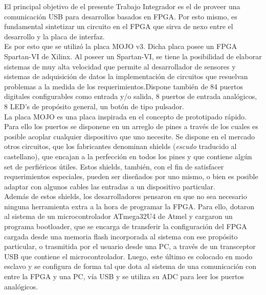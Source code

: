 El principal objetivo de el presente Trabajo Integrador es el de proveer una comunicación USB para desarrollos basados en FPGA. Por esto mismo, es fundamental sintetizar un circuito en el FPGA que sirva de nexo entre el desarrollo y la placa de interfaz.\\

Es por esto que se utilizó la placa MOJO v3. Dicha placa posee un FPGA Spartan-VI de Xilinx. Al poseer un Spartan-VI, se tiene la posibilidad de elaborar sistemas de muy alta velocidad que permite al desarrollador de sensores y sistemas de adquisición de datos la implementación de circuitos que resuelvan problemas a la medida de los requerimientos.Dispone también de 84 puertos digitales configurables como entrada y/o salida, 8 puertos de entrada analógicos, 8 LED's de propósito general, un botón de tipo pulsador.\\

La placa MOJO es una placa inspirada en el concepto de prototipado rápido. Para ello los puertos se disponene en un arreglo de pines a través de los cuales es posible acoplar cualquier dispositivo que uno necesite. Se dispone en el mercado otros circuitos, que los fabricantes denominan shields ({\it escudo} traducido al castellano), que encajan a la perfección en todos los pines y que contiene algún set de perfiéricos útiles. Estos shields, también, con el fin de satisfacer requerimientos especiales, pueden ser diseñados por uno mismo, o bien es posible adaptar con algunos cables las entradas a un dispositivo particular.\\

Además de estos shields, los desarrolladores pensaron en que no sea necesario ninguna herramienta extra a la hora de programar la FPGA. Para ello, dotaron al sistema de un microcontrolador ATmega32U4 de Atmel y cargaron un programa bootloader, que se encarga de transferir la configuración del FPGA cargada desde una memoria flash incorporada al sistema con ese propósito particular, o trasmitida por el usuario desde una PC, a través de un transceptor USB que contiene el microcontrolador. Luego, este último es colocado en modo esclavo y se configura de forma tal que dota al sistema de una comunicación con entre la FPGA y una PC, vía USB y se utiliza su ADC para leer los puertos analógicos.\\%

